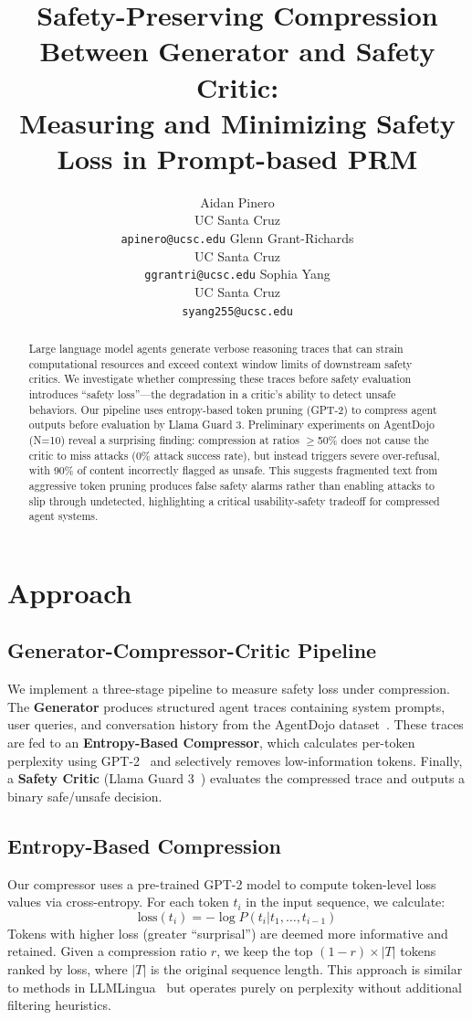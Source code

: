 \documentclass[11pt]{article}
\title{Safety-Preserving Compression Between Generator and Safety Critic: \\ Measuring and Minimizing Safety Loss in Prompt-based PRM}
\author{
  Aidan Pinero \\
  UC Santa Cruz \\
  \texttt{apinero@ucsc.edu} \And
  Glenn Grant-Richards \\
  UC Santa Cruz \\
  \texttt{ggrantri@ucsc.edu} \And
  Sophia Yang \\
  UC Santa Cruz \\
  \texttt{syang255@ucsc.edu} 
}
\begin{document}
\maketitle

\begin{abstract}
Large language model agents generate verbose reasoning traces that can strain computational resources and exceed context window limits of downstream safety critics. We investigate whether compressing these traces before safety evaluation introduces ``safety loss''—the degradation in a critic's ability to detect unsafe behaviors. Our pipeline uses entropy-based token pruning (GPT-2) to compress agent outputs before evaluation by Llama Guard 3. Preliminary experiments on AgentDojo (N=10) reveal a surprising finding: compression at ratios $\geq$50\% does not cause the critic to miss attacks (0\% attack success rate), but instead triggers severe over-refusal, with 90\% of content incorrectly flagged as unsafe. This suggests fragmented text from aggressive token pruning produces false safety alarms rather than enabling attacks to slip through undetected, highlighting a critical usability-safety tradeoff for compressed agent systems.
\end{abstract}

\section{Approach}

\subsection{Generator-Compressor-Critic Pipeline}
We implement a three-stage pipeline to measure safety loss under compression. The \textbf{Generator} produces structured agent traces containing system prompts, user queries, and conversation history from the AgentDojo dataset~\cite{agentdojo}. These traces are fed to an \textbf{Entropy-Based Compressor}, which calculates per-token perplexity using GPT-2~\cite{gpt2} and selectively removes low-information tokens. Finally, a \textbf{Safety Critic} (Llama Guard 3~\cite{llamaguard3}) evaluates the compressed trace and outputs a binary safe/unsafe decision.

\subsection{Entropy-Based Compression}
Our compressor uses a pre-trained GPT-2 model to compute token-level loss values via cross-entropy. For each token $t_i$ in the input sequence, we calculate:
\[
\text{loss}(t_i) = -\log P(t_i | t_1, \ldots, t_{i-1})
\]
Tokens with higher loss (greater ``surprisal'') are deemed more informative and retained. Given a compression ratio $r$, we keep the top $(1-r) \times |T|$ tokens ranked by loss, where $|T|$ is the original sequence length. This approach is similar to methods in LLMLingua~\cite{llmlingua} but operates purely on perplexity without additional filtering heuristics.
\end{document}
